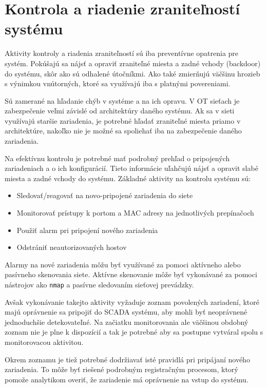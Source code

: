 \section{Kontrola a riadenie zraniteľností systému}
\tab Aktivity kontroly a riadenia zraniteľností sú iba preventívne opatrenia pre systém. Pokúšajú sa nájsť a opraviť zraniteľné miesta a zadné vchody (backdoor) do systému, skôr ako sú odhalené útočníkmi. Ako také zmierňujú väčšinu hrozieb s výnimkou vnútorných, ktoré sa využívajú iba s platnými povereniami. \par
Sú zamerané na hľadanie chýb v systéme a na ich opravu. V OT sieťach je zabezpečenie veľmi závislé od architektúry daného systému. Ak sa v sieti využívajú staršie zariadenia, je potrebné hľadať zraniteľné miesta priamo v architektúre, nakoľko nie je možné sa spoliehať iba na zabezpečenie daného zariadenia. \par
Na efektívnu kontrolu je potrebné mať podrobný prehľad o pripojených zariadeniach a o ich konfigurácií. Tieto informácie uľahčujú nájsť a opravit slabé miesta a zadné vchody do systému. Základné aktivity na kontrolu systému sú:
\begin{itemize}
\item Sledovať/reagovať na novo-pripojené zariadenia do siete
\item Monitorovať prístupy k portom a MAC adresy na jednotlivých prepínačoch
\item Použiť alarm pri pripojení nového zariadenia
\item Odstrániť neautorizovaných hostov
\end{itemize}
Alarmy na nové zariadenia môžu byť využívané za pomoci aktívneho alebo pasívneho skenovania siete. Aktívne skenovanie môže byť vykonávané za pomoci nástrojov ako {\tt nmap} a pasívne sledovaním sieťovej prevádzky. \par
Avšak vykonávanie takejto aktivity vyžaduje zoznam povolených zariadení, ktoré majú oprávnenie sa pripojiť do SCADA systému, aby mohli byť neoprávnené jednoduchšie detekovateľné. Na začiatku monitorovania ale väčšinou obdobný zoznam nie je plne k dispozícií a tak je potrebné aby sa postupne vytváral spolu s monitorovacou aktivitou. \par
Okrem zoznamu je tiež potrebné dodržiavať isté pravidlá pri pripájaní nového zariadenia. To môže byť riešené podrobným registračným procesom, ktorý pomože analytikom overiť, že zariadenie má oprávnenie na vstup do systému\cite{Security}.

